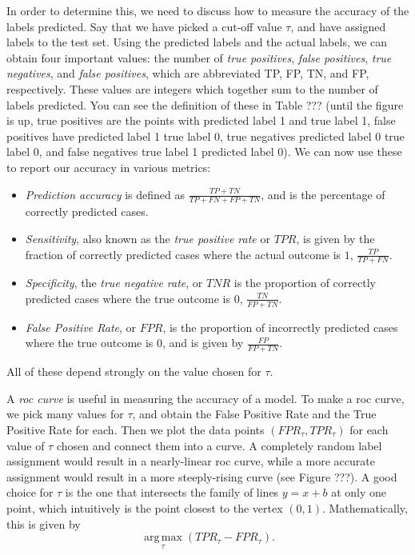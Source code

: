 In order to determine this, we need to discuss how to measure the accuracy of the labels predicted.  Say that we have picked a cut-off value $\tau$, and have assigned labels to the test set.  Using the predicted labels and the actual labels, we can obtain four important values: the number of \emph{true positives}, \emph{false positives}, \emph{true negatives}, and \emph{false positives}, which are abbreviated TP, FP, TN, and FP, respectively.  These values are integers which together sum to the number of labels predicted.  You can see the definition of these in Table ??? (until the figure is up, true positives are the points with predicted label 1 and true label 1, false positives have predicted label 1 true label 0, true negatives predicted label 0 true label 0, and false negatives true label 1 predicted label 0).  We can now use these to report our accuracy in various metrics:
\begin{itemize}
\item \emph{Prediction accuracy} is defined as $\frac{TP+TN}{TP+FN+FP+TN}$, and is the percentage of correctly predicted cases.
\item \emph{Sensitivity}, also known as the \emph{true positive rate} or $TPR$, is given by the fraction of correctly predicted cases where the actual outcome is $1$, $\frac{TP}{TP+FN}$.
\item \emph{Specificity}, the \emph{true negative rate}, or $TNR$ is the proportion of correctly predicted cases where the true outcome is $0$, $\frac{TN}{FP+TN}$.
\item \emph{False Positive Rate}, or $FPR$, is the proportion of incorrectly predicted cases where the true outcome is $0$, and is given by $\frac{FP}{FP+TN}$.
\end{itemize}
All of these depend strongly on the value chosen for $\tau$.

A \emph{roc curve} is useful in measuring the accuracy of a model.  To make a roc curve, we pick many values for $\tau$, and obtain the False Positive Rate and the True Positive Rate for each.  Then we plot the data points  $(FPR_{\tau},TPR_{\tau})$ for each value of $\tau$ chosen and connect them into a curve.  A completely random label assignment would result in a nearly-linear roc curve, while a more accurate assignment would result in a more steeply-rising curve (see Figure ???).  A good choice for $\tau$ is the one that intersects the family of lines $y=x+b$ at only one point, which intuitively is the point closest to the vertex $(0, 1)$.  Mathematically, this is given by
\begin{equation}
\operatorname*{arg\,max}_{\tau} (TPR_{\tau} - FPR_{\tau}).
\end{equation}

